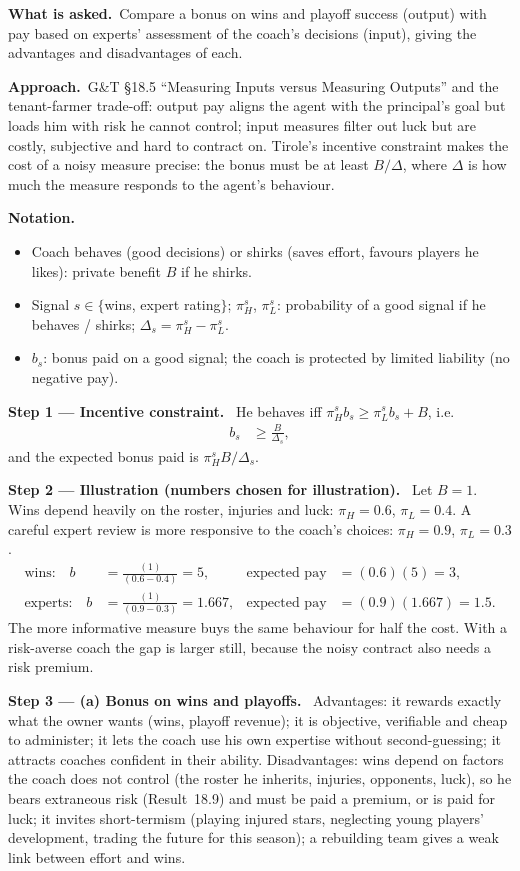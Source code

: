 \documentclass[11pt,a4paper]{article}
\newcommand{\notation}{\par\noindent\textbf{Notation.}}
\newcommand{\step}[2]{\par\medskip\noindent\textbf{Step #1 --- #2.}~}
\newcommand{\asked}{\par\medskip\noindent\textbf{What is asked.}~}
\newcommand{\approach}{\par\smallskip\noindent\textbf{Approach.}~}
\begin{document}
\asked Compare a bonus on wins and playoff success (output) with pay based on experts' assessment of the coach's decisions (input), giving the advantages and disadvantages of each.

\approach G\&T \S18.5 ``Measuring Inputs versus Measuring Outputs'' and the tenant-farmer trade-off: output pay aligns the agent with the principal's goal but loads him with risk he cannot control; input measures filter out luck but are costly, subjective and hard to contract on. Tirole's incentive constraint makes the cost of a noisy measure precise: the bonus must be at least $B/\Delta$, where $\Delta$ is how much the measure responds to the agent's behaviour.

\notation
\begin{itemize}
  \item Coach behaves (good decisions) or shirks (saves effort, favours players he likes): private benefit $B$ if he shirks.
  \item Signal $s\in\{$wins, expert rating$\}$; $\pi^s_H$, $\pi^s_L$: probability of a good signal if he behaves / shirks; $\Delta_s=\pi^s_H-\pi^s_L$.
  \item $b_s$: bonus paid on a good signal; the coach is protected by limited liability (no negative pay).
\end{itemize}

\step{1}{Incentive constraint} He behaves iff $\pi^s_H b_s\ge \pi^s_L b_s + B$, i.e.
\begin{align}
  b_s &\ge \frac{B}{\Delta_s}, \label{r8be6-ic}
\end{align}
and the expected bonus paid is $\pi^s_H B/\Delta_s$.

\step{2}{Illustration (numbers chosen for illustration)} Let $B=1$. Wins depend heavily on the roster, injuries and luck: $\pi_H=0.6$, $\pi_L=0.4$. A careful expert review is more responsive to the coach's choices: $\pi_H=0.9$, $\pi_L=0.3$.
\begin{align}
  \text{wins:}\quad b &= \frac{(1)}{(0.6-0.4)} = 5, & \text{expected pay} &= (0.6)(5) = 3, \label{r8be6-wins}\\
  \text{experts:}\quad b &= \frac{(1)}{(0.9-0.3)} = 1.667, & \text{expected pay} &= (0.9)(1.667) = 1.5. \label{r8be6-exp}
\end{align}
The more informative measure buys the same behaviour for half the cost. With a risk-averse coach the gap is larger still, because the noisy contract also needs a risk premium.

\step{3}{(a) Bonus on wins and playoffs}
Advantages: it rewards exactly what the owner wants (wins, playoff revenue); it is objective, verifiable and cheap to administer; it lets the coach use his own expertise without second-guessing; it attracts coaches confident in their ability.
Disadvantages: wins depend on factors the coach does not control (the roster he inherits, injuries, opponents, luck), so he bears extraneous risk (Result~18.9) and must be paid a premium, or is paid for luck; it invites short-termism (playing injured stars, neglecting young players' development, trading the future for this season); a rebuilding team gives a weak link between effort and wins.
\end{document}
